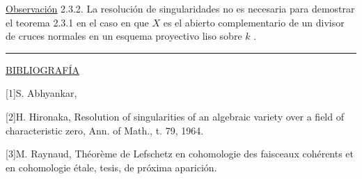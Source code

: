 
\underline{Observación} 2.3.2.  La resolución de singularidades no es necesaria para demostrar el teorema 2.3.1 en el caso en que  $X$  es el abierto complementario de un divisor de cruces normales en un esquema proyectivo liso sobre  $k$ .

\begin{center}\rule{1.5cm}{0.4pt}\end{center}

\underline{BIBLIOGRAFÍA}

[1]\quad S. Abhyankar, 

[2]\quad H. Hironaka, Resolution of singularities of an algebraic variety over a field of characteristic zero, Ann. of Math., t. 79, 1964.

[3]\quad M. Raynaud, Théorème de Lefschetz en cohomologie des faisceaux cohérents et en cohomologie étale, tesis, de próxima aparición.
